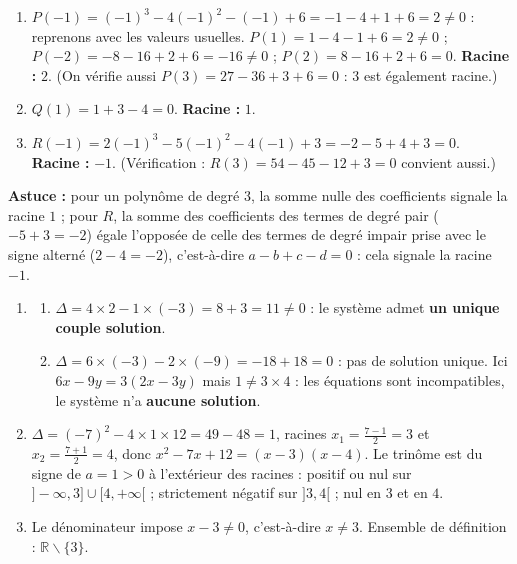 \documentclass[11pt]{article}
\def\setminus{\mathbin{\backslash}}\let\smallsetminus\setminus
\begin{document}
\begin{corrige}
\begin{enumerate}
\item $P(-1)=(-1)^3-4(-1)^2-(-1)+6=-1-4+1+6=2\neq 0$ : reprenons avec les valeurs usuelles. $P(1)=1-4-1+6=2\neq 0$ ; $P(-2)=-8-16+2+6=-16\neq 0$ ; $P(2)=8-16+2+6=0$. \textbf{Racine :} $2$. (On vérifie aussi $P(3)=27-36+3+6=0$ : $3$ est également racine.)
\item $Q(1)=1+3-4=0$. \textbf{Racine :} $1$.
\item $R(-1)=2(-1)^3-5(-1)^2-4(-1)+3=-2-5+4+3=0$. \textbf{Racine :} $-1$. (Vérification : $R(3)=54-45-12+3=0$ convient aussi.)
\end{enumerate}
\textbf{Astuce :} pour un polynôme de degré $3$, la somme nulle des coefficients signale la racine $1$ ; pour $R$, la somme des coefficients des termes de degré pair ($-5+3=-2$) égale l'opposée de celle des termes de degré impair prise avec le signe alterné ($2-4=-2$), c'est-à-dire $a-b+c-d=0$ : cela signale la racine $-1$.
\end{corrige}

\begin{corrige}
\begin{enumerate}
\item \begin{enumerate}
\item $\Delta=4\times 2-1\times(-3)=8+3=11\neq 0$ : le système admet \textbf{un unique couple solution}.
\item $\Delta=6\times(-3)-2\times(-9)=-18+18=0$ : pas de solution unique. Ici $6x-9y=3(2x-3y)$ mais $1\neq 3\times 4$ : les équations sont incompatibles, le système n'a \textbf{aucune solution}.
\end{enumerate}
\item $\Delta=(-7)^2-4\times 1\times 12=49-48=1$, racines $x_1=\frac{7-1}{2}=3$ et $x_2=\frac{7+1}{2}=4$, donc $x^2-7x+12=(x-3)(x-4)$. Le trinôme est du signe de $a=1>0$ à l'extérieur des racines : positif ou nul sur $]-\infty,3]\cup[4,+\infty[$ ; strictement négatif sur $]3,4[$ ; nul en $3$ et en $4$.
\item Le dénominateur impose $x-3\neq 0$, c'est-à-dire $x\neq 3$. Ensemble de définition : $\mathbb{R}\setminus\{3\}$.
\end{enumerate}
\end{corrige}
\end{document}
